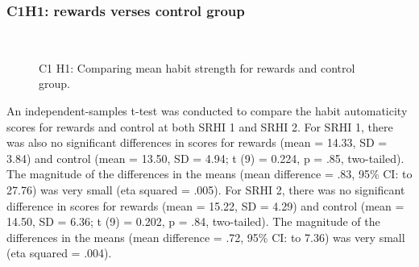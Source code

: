 \documentclass{scaffold/sigchi}
\begin{document}
\subsubsection{C1H1: rewards verses control group}


\begin{figure}
  \centering
  \caption{C1 H1: Comparing mean habit strength for rewards and control group.}~\label{fig:habit_4_item_survey1_v_survey2}
\end{figure}

An independent-samples t-test was conducted to compare the habit automaticity scores
for rewards and control at both SRHI 1 and SRHI 2. For SRHI 1, there was also no significant differences in scores for rewards (mean = 14.33, SD = 3.84) and control (mean = 13.50, SD = 4.94; t (9) = 0.224, p = .85,
two-tailed). The magnitude of the differences in the means (mean difference = .83,
95\% CI:  to 27.76) was very small (eta squared = .005). For SRHI 2, there was no significant difference in scores for rewards
(mean = 15.22, SD = 4.29) and control (mean = 14.50, SD = 6.36; t (9) = 0.202, p = .84,
two-tailed). The magnitude of the differences in the means (mean difference = .72,
95\% CI:  to 7.36) was very small (eta squared = .004).
\end{document}
